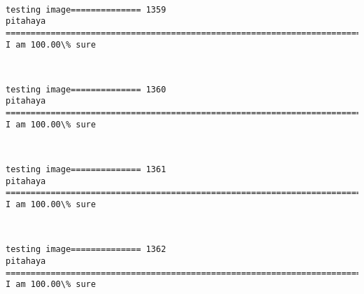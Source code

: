 \documentclass[11pt]{article}
\begin{document}
    \begin{center}
    \end{center}
    { \hspace*{\fill} \\}
    
    \begin{Verbatim}[commandchars=\\\{\}]
testing image============== 1359
pitahaya
============================================================================
I am 100.00\% sure

    \end{Verbatim}

    \begin{center}
    \end{center}
    { \hspace*{\fill} \\}
    
    \begin{Verbatim}[commandchars=\\\{\}]
testing image============== 1360
pitahaya
============================================================================
I am 100.00\% sure

    \end{Verbatim}

    \begin{center}
    \end{center}
    { \hspace*{\fill} \\}
    
    \begin{Verbatim}[commandchars=\\\{\}]
testing image============== 1361
pitahaya
============================================================================
I am 100.00\% sure

    \end{Verbatim}

    \begin{center}
    \end{center}
    { \hspace*{\fill} \\}
    
    \begin{Verbatim}[commandchars=\\\{\}]
testing image============== 1362
pitahaya
============================================================================
I am 100.00\% sure

    \end{Verbatim}
\end{document}
